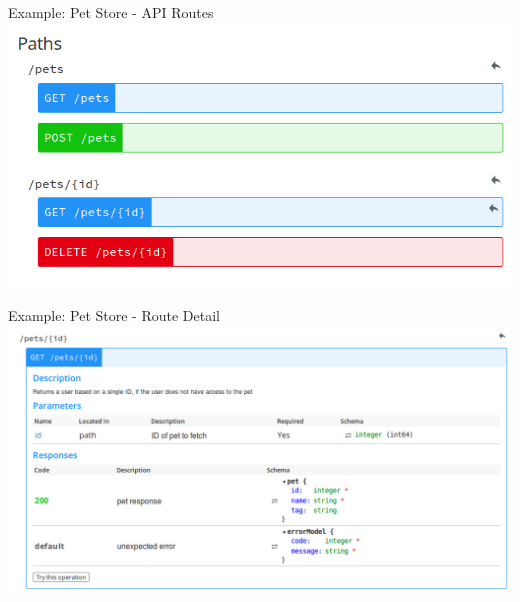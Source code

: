 \begin{frame}[allowframebreaks]
	\framebreak
	
	\begin{exampleblock}{Example: Pet Store - API Routes}
		\includegraphics[width=\textwidth]{./img/api_example_paths_alpha.png}
	\end{exampleblock}
	
	\framebreak
		
	\begin{exampleblock}{Example: Pet Store - Route Detail}
		\includegraphics[width=\textwidth]{./img/api_example_route_alpha.png}
	\end{exampleblock}
	
	\framebreak
			

\end{frame}
